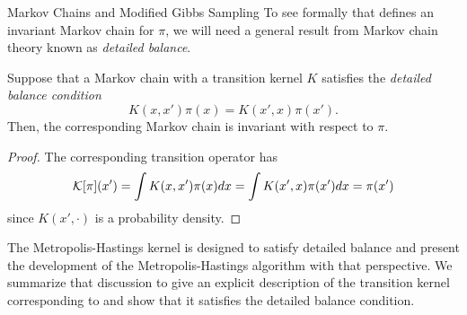 \begin{chapter}{Markov Chains and Modified Gibbs Sampling}
To see formally that  defines an invariant Markov chain for $\pi$, we will need a general result from Markov chain theory known as \emph{detailed balance}.
\begin{thm}
  Suppose that a Markov chain with a transition kernel $K$ satisfies the \emph{detailed balance condition} 
  \begin{equation} \label{eq:detailedBalance}
    K(x,x')\pi(x) = K(x',x) \pi(x').
  \end{equation}
  Then, the corresponding Markov chain is invariant with respect to $\pi$.
\end{thm}
\begin{proof}
  The corresponding transition operator has
  \begin{equation}
    \mathcal K[\pi](x') = \int K(x,x') \pi(x)dx = \int K(x',x)\pi(x')dx = \pi(x')
  \end{equation}
  since $K(x',\cdot)$ is a probability density.
\end{proof}
The Metropolis-Hastings kernel is designed to satisfy detailed balance and \citep{calvetti2007introduction} present the development of the Metropolis-Hastings algorithm with that perspective.
We summarize that discussion to give an explicit description of the transition kernel corresponding to  and show that it satisfies the detailed balance condition.


\end{chapter}
